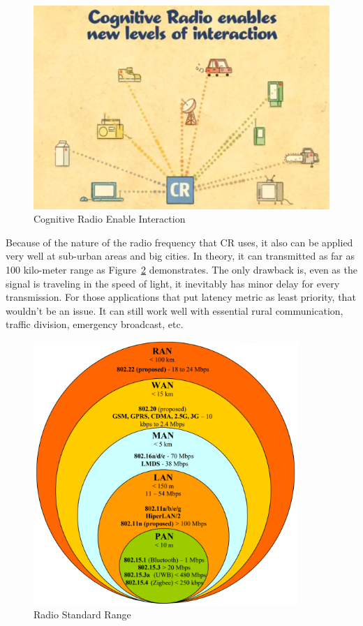 \begin{figure}[ht]
\centering
\includegraphics[width=14cm]{figures/interaction.jpg}
\caption{Cognitive Radio Enable Interaction \cite{nokia_blog}}
\label{fig:interaction}
\end{figure}

Because of the nature of the radio frequency that CR uses, it also can be applied very well at sub-urban areas and big cities.
In theory, it can transmitted as far as 100 kilo-meter range as Figure~\ref{fig:radio_range} demonstrates. The only drawback
is, even as the signal is traveling in the speed of light, it inevitably has minor delay for every transmission. For those
applications that put latency metric as least priority, that wouldn't be an issue. It can still work well with essential
rural communication, traffic division, emergency broadcast, etc. 

\begin{figure}[ht]
\centering
\includegraphics[width=10cm]{figures/radio_range.png}
\caption{Radio Standard Range \cite{ieee_802_22}}
\label{fig:radio_range}
\end{figure}

